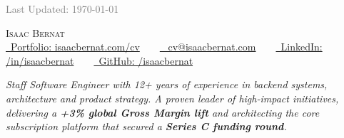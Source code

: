 \documentclass[a4paper,11pt]{article}
\begin{document}

\noindent\textcolor{grey}{\small\hfill Last Updated: \today}
\vspace{-1em} %

\begin{center}
    {\Huge \scshape Isaac Bernat} \\ \vspace{1pt}
    \small 
    \href{https://www.isaacbernat.com/cv}{\raisebox{-0.1\height}\faLink\ Portfolio: isaacbernat.com/cv} ~ \textbullet ~
    \href{mailto:cv@isaacbernat.com}{\raisebox{-0.1\height}\faEnvelope\ 
    cv@isaacbernat.com} ~ \textbullet ~
    \href{https://linkedin.com/in/isaacbernat}{\raisebox{-0.1\height}\faLinkedin\ LinkedIn: /in/isaacbernat} ~ \textbullet ~
    \href{https://github.com/isaacbernat}{\raisebox{-0.1\height}\faGithub\ GitHub: /isaacbernat}
    \vspace{-8pt}
\end{center}



\vspace{0.2em} %
\begin{center}
    \begin{minipage}{0.85\textwidth} %
        \small \textit{Staff Software Engineer with 12+ years of experience in backend systems, architecture and product strategy. A proven leader of high-impact initiatives, delivering a \textbf{+3\% global Gross Margin lift} and architecting the core subscription platform that secured a \textbf{Series C funding round}.}
    \end{minipage}
\end{center}
\vspace{-0.7em} %
\end{document}
